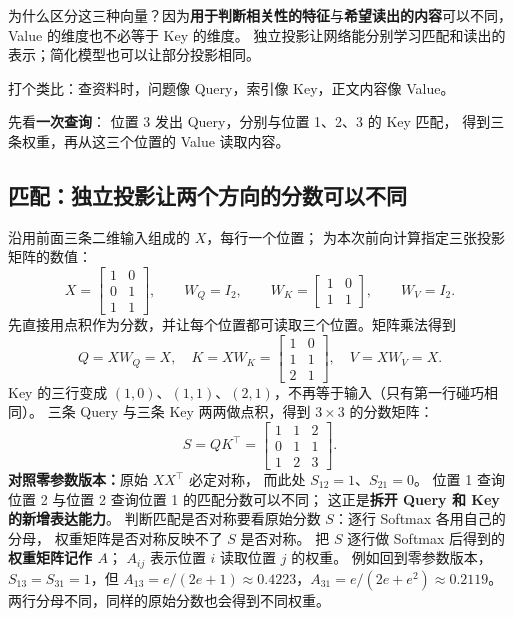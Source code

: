 为什么区分这三种向量？因为\textbf{用于判断相关性的特征}与\textbf{希望读出的内容}可以不同，
Value 的维度也不必等于 Key 的维度。
独立投影让网络能分别学习匹配和读出的表示；简化模型也可以让部分投影相同。

打个类比：查资料时，问题像 Query，索引像 Key，正文内容像 Value。

先看\textbf{一次查询}：
位置 3 发出 Query，分别与位置 1、2、3 的 Key 匹配，
得到三条权重，再从这三个位置的 Value 读取内容。

\subsection{匹配：独立投影让两个方向的分数可以不同}

沿用前面三条二维输入组成的 $X$，每行一个位置；
为本次前向计算指定三张投影矩阵的数值：
\[
X=\begin{bmatrix}1&0\\0&1\\1&1\end{bmatrix},\qquad
W_Q=I_2,\qquad
W_K=\begin{bmatrix}1&0\\1&1\end{bmatrix},\qquad W_V=I_2.
\]
先直接用点积作为分数，并让每个位置都可读取三个位置。矩阵乘法得到
\[
Q=XW_Q=X,\quad
K=XW_K=\begin{bmatrix}1&0\\1&1\\2&1\end{bmatrix},\quad
V=XW_V=X.
\]
Key 的三行变成 $(1,0)$、$(1,1)$、$(2,1)$，不再等于输入（只有第一行碰巧相同）。
三条 Query 与三条 Key 两两做点积，得到 $3\times3$ 的分数矩阵：
\begin{equation}
S=QK^\top
=\boxed{\begin{bmatrix}1&1&2\\0&1&1\\1&2&3\end{bmatrix}}.
\label{eq:asymmetric-qk-example}
\end{equation}
\textbf{对照零参数版本：}原始 $XX^\top$ 必定对称，
而此处 $S_{12}=\boxed{1}$、$S_{21}=\boxed{0}$。
位置 1 查询位置 2 与位置 2 查询位置 1 的匹配分数可以不同；
这正是\textbf{拆开 Query 和 Key 的新增表达能力}。
判断匹配是否对称要看原始分数 $S$：逐行 Softmax 各用自己的分母，
权重矩阵是否对称反映不了 $S$ 是否对称。
把 $S$ 逐行做 Softmax 后得到的\textbf{权重矩阵记作 $A$}；
$A_{ij}$ 表示位置 $i$ 读取位置 $j$ 的权重。
例如回到零参数版本，$S_{13}=S_{31}=1$，但
$A_{13}=e/(2e+1)\approx0.4223$，$A_{31}=e/(2e+e^2)\approx0.2119$。
两行分母不同，同样的原始分数也会得到不同权重。

